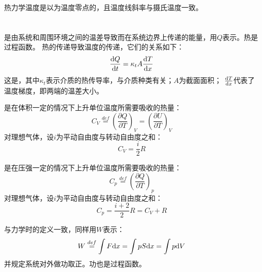             热力学温度是以为温度零点的，且温度线斜率与摄氏温度一致。
    \section[热力学第一定律]{}
        \subsection[热与功]{}
            \begin{Itemize}
                \item {}是由系统和周围环境之间的温差导致而在系统边界上传递的能量，用$Q$表示。热是过程函数。
                热的传递导致温度的传递，它们的关系如下：
                \begin{equation}
                    \frac{\mathrm{d}{Q}}{\mathrm{d}{t}} = \kappa_{t}A\frac{\mathrm{d}{T}}{\mathrm{d}{x}}
                \end{equation}
                这是，其中$\kappa_{t}$表示介质的热传导率，与介质种类有关；$A$为截面面积；
                $\frac{\mathrm{d}{T}}{\mathrm{d}{x}}$代表了温度梯度，即两端的温差大小。
                \item {}是在体积一定的情况下上升单位温度所需要吸收的热量：
                \begin{equation}
                    C_{V} \overset{def}{=} \left(\frac{\partial{Q}}{\partial{T}}\right)_{V} = \left(\frac{\partial{U}}{\partial{T}}\right)_{V}
                    \nonumber
                \end{equation}
                对理想气体，设$i$为平动自由度与转动自由度之和：
                \begin{equation}
                    C_{V} = \frac{i}{2}R
                    \nonumber
                \end{equation}
                \item {}是在压强一定的情况下上升单位温度所需要吸收的热量：
                \begin{equation}
                    C_{p} \overset{def}{=} \left(\frac{\partial{Q}}{\partial{T}}\right)_{p} %
                    \nonumber
                \end{equation}
                对理想气体，设$i$为平动自由度与转动自由度之和：
                \begin{equation}
                    C_{p} = \frac{i+2}{2}R = C_{V}+R
                    \nonumber
                \end{equation}
                \item {}与力学时的定义一致，同样用$W$表示：
                \begin{equation}
                    W \overset{def}{=} \int F\mathrm{d}{x} = \int pS\mathrm{d}{x} = \int p\mathrm{d}{V}
                    \nonumber
                \end{equation}
                并规定系统对外做功取正。功也是过程函数。                
            \end{Itemize}

